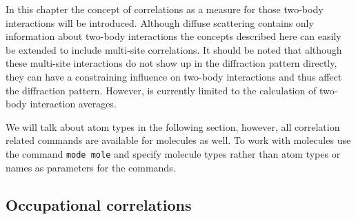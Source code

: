 In this chapter the concept of correlations as a measure for those
two-body interactions will be introduced. Although diffuse
scattering contains only information about two-body interactions the
concepts described here can easily be extended to include multi-site
correlations. It should be noted that although these multi-site
interactions do not show up in the diffraction pattern directly,
they can have a constraining influence on two-body interactions and
thus affect the diffraction pattern. However, \Discus is
currently limited to the calculation of two-body interaction
averages. \par

We will talk about atom types in the following section, however, all
correlation related commands are available for molecules as well. To
work with molecules use the command {\tt mode mole} and specify
molecule types rather than atom types or names as parameters for the
commands.

\subsection*{Occupational correlations \label{chem-corr-occ}}

